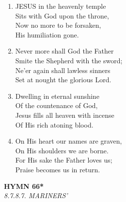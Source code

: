 \begin{enumerate}
    \item JESUS in the heavenly temple \\
        Sits with God upon the throne, \\
        Now no more to be forsaken, \\
        His humiliation gone.

    \item Never more shall God the Father \\
        Smite the Shepherd with the sword; \\
        Ne'er again shall lawless sinners \\
        Set at nought the glorious Lord.

    \item Dwelling in eternal sunshine \\
        Of the countenance of God, \\
        Jesus fills all heaven with incense \\
        Of His rich atoning blood.

    \item On His heart our names are graven, \\
        On His shoulders we are borne. \\
        For His sake the Father loves us; \\
        Praise becomes us in return.

\end{enumerate}

\newpage
\begin{center}
    {\Large \textbf{HYMN 66*}}
    \\
    \textit{8.7.8.7. MARINERS'}
\end{center}
\vspace{1em}

